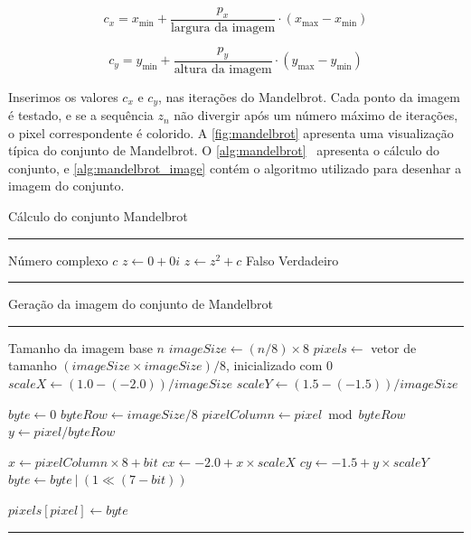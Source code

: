 \begin{equation}
	\label{eq:mandelbrot_cx}
	c_x = x_{\text{min}} + \frac{p_x}{\text{largura da imagem}} \cdot (x_{\text{max}} - x_{\text{min}})
\end{equation}

\begin{equation}
	\label{eq:mandelbrot_cy}
	c_y = y_{\text{min}} + \frac{p_y}{\text{altura da imagem}} \cdot (y_{\text{max}} - y_{\text{min}})
\end{equation}

Inserimos os valores $c_x$ e $c_y$, nas iterações do Mandelbrot. Cada ponto da imagem é testado, e se a sequência $z_n$ não divergir após um número máximo de iterações, o pixel correspondente é colorido. A \autoref{fig:mandelbrot} apresenta uma visualização típica do conjunto de Mandelbrot. O \autoref{alg:mandelbrot}~\cite{debianBenchmarksGame} apresenta o cálculo do conjunto, e \autoref{alg:mandelbrot_image} contém o algoritmo utilizado para desenhar a imagem do conjunto.

\begin{algorithm}[htb]
	\caption{Cálculo do conjunto Mandelbrot}
	\label{alg:mandelbrot}
	\hrule
	\begin{algorithmic}[1]
		\REQUIRE Número complexo $c$
		\STATE $z \gets 0 + 0i$
		\STATE $z \gets z^2 + c$
		\RETURN Falso
		\ENDIF
		\ENDFOR
		\RETURN Verdadeiro
	\end{algorithmic}
	\hrule
	\fonte{}
\end{algorithm}

\begin{algorithm}[htb]
	\caption{Geração da imagem do conjunto de Mandelbrot}
	\label{alg:mandelbrot_image}
	\hrule
	\begin{algorithmic}[1]
		\REQUIRE Tamanho da imagem base $n$
		\STATE $imageSize \gets (n / 8) \times 8$
		\STATE $pixels \gets$ vetor de tamanho $(imageSize \times imageSize) / 8$, inicializado com $0$
		\STATE $scaleX \gets (1.0 - (-2.0)) / imageSize$
		\STATE $scaleY \gets (1.5 - (-1.5)) / imageSize$

		\STATE $byte \gets 0$
		\STATE $byteRow \gets imageSize / 8$
		\STATE $pixelColumn \gets pixel \bmod byteRow$
		\STATE $y \gets pixel / byteRow$

		\STATE $x \gets pixelColumn \times 8 + bit$
		\STATE $cx \gets -2.0 + x \times scaleX$
		\STATE $cy \gets -1.5 + y \times scaleY$
		\STATE $byte \gets byte\ |\ (1 \ll (7 - bit))$
		\ENDIF
		\ENDFOR

		\STATE $pixels[pixel] \gets byte$
		\ENDFOR
	\end{algorithmic}
	\hrule
	\fonte{}
\end{algorithm}

